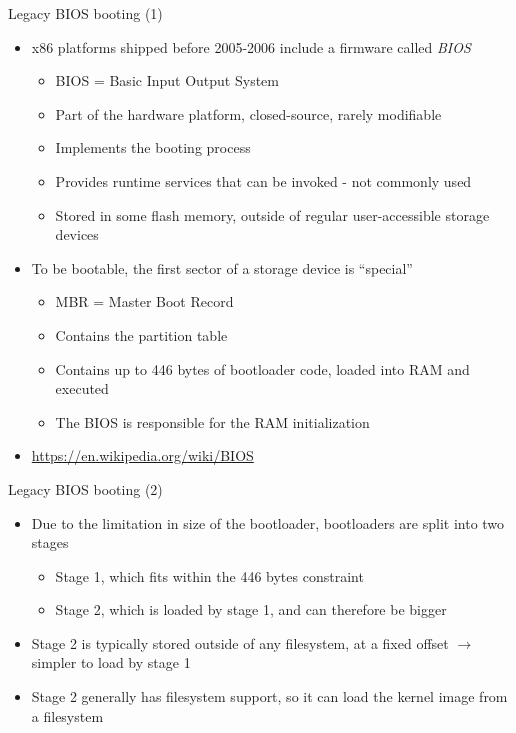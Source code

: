 \begin{frame}{Legacy BIOS booting (1)}
  \begin{itemize}
  \item x86 platforms shipped before 2005-2006 include a firmware
    called {\em BIOS}
    \begin{itemize}
    \item BIOS = Basic Input Output System
    \item Part of the hardware platform, closed-source, rarely
      modifiable
    \item Implements the booting process
    \item Provides runtime services that can be invoked - not commonly
      used
    \item Stored in some flash memory, outside of regular
      user-accessible storage devices
    \end{itemize}
  \item To be bootable, the first sector of a storage device is
    ``special''
    \begin{itemize}
    \item MBR = Master Boot Record
    \item Contains the partition table
    \item Contains up to 446 bytes of bootloader code, loaded into RAM
      and executed
    \item The BIOS is responsible for the RAM initialization
    \end{itemize}
  \item \url{https://en.wikipedia.org/wiki/BIOS}
  \end{itemize}
\end{frame}

\begin{frame}{Legacy BIOS booting (2)}
  \begin{itemize}
  \item Due to the limitation in size of the bootloader, bootloaders
    are split into two stages
    \begin{itemize}
    \item Stage 1, which fits within the 446 bytes constraint
    \item Stage 2, which is loaded by stage 1, and can therefore be
      bigger
    \end{itemize}
  \item Stage 2 is typically stored outside of any filesystem, at a
    fixed offset $\rightarrow$ simpler to load by stage 1
  \item Stage 2 generally has filesystem support, so it can load the
    kernel image from a filesystem
  \end{itemize}
\end{frame}

